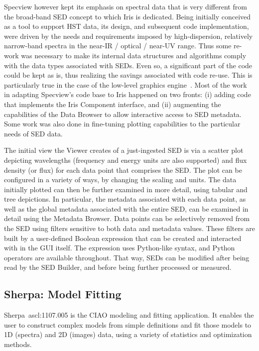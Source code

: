 \documentclass[final,5p,authoryear]{elsarticle}
\begin{document}
Specview however kept its emphasis on spectral data that is very different from
the broad-band SED concept to which Iris is dedicated. Being initially conceived
as a tool to support HST data, its design, and subsequent code implementation,
were driven by the needs and requirements imposed by high-dispersion, relatively
narrow-band spectra in the near-IR / optical / near-UV range. Thus some re-work
was necessary to make its internal data structures and algorithms comply with
the data types associated with SEDs. Even so, a significant part of the code
could be kept as is, thus realizing the savings associated with code re-use.
This is particularly true in the case of the low-level graphics
engine~\citep{2000ASPC..216...79B}. Most of the work in adapting Specview's code
base to Iris happened on two fronts: (i) adding code that implements the Iris
Component interface, and (ii) augmenting the capabilities of the Data Browser to
allow interactive access to SED metadata. Some work was also done in fine-tuning
plotting capabilities to the particular needs of SED data.

The initial view the Viewer creates of a just-ingested SED is via a scatter plot
depicting wavelengths (frequency and energy units are also supported) and flux
density (or flux) for each data point that comprises the SED. The plot can be
configured in a variety of ways, by changing the scaling and units. The data
initially plotted can then be further examined in more detail, using tabular and
tree depictions. In particular, the metadata associated with each data point, as
well as the global metadata associated with the entire SED, can be examined in
detail using the Metadata Browser. Data points can be selectively removed from
the SED using filters sensitive to both data and metadata values. These filters
are built by a user-defined Boolean expression that can be created and
interacted with in the GUI itself. The expression uses Python-like syntax, and
Python operators are available throughout. That way, SEDs can be modified after
being read by the SED Builder, and before being further processed or measured.

\subsection{Sherpa: Model Fitting} \label{subsec:sherpa} Sherpa~ascl:1107.005 is the CIAO
modeling and fitting application. It enables the user to construct complex
models from simple definitions and fit those models to 1D (spectra) and 2D
(images) data, using a variety of statistics and optimization methods.
\end{document}
